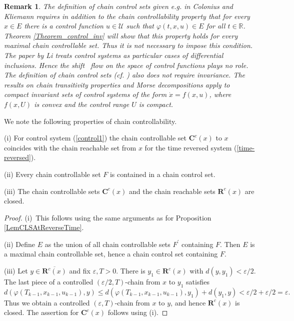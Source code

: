 \documentclass{siamltex}%
\newtheorem{remark}[theorem]{Remark}
\begin{document}
\begin{remark}
\label{Remark_invariance}The definition of chain control sets given e.g. in
Colonius and Kliemann \cite{ColK00} requires in addition to the chain
controllability property that for every $x\in E$ there is a control function
$u\in\mathcal{U}$ such that $\varphi(t,x,u)\in E$ for all $t\in\mathbb{R}$.
Theorem \ref{Theorem_control_inv}\textbf{ }will show that this property holds
for every maximal chain controllable set. Thus it is not necessary to impose
this condition. The paper by Li \cite[Proposition 6.8]{Li07} treats control
systems as particular cases of differential inclusions. Hence the shift \ flow
on the space of control functions plays no role. The definition of chain
control sets (cf. \cite[Definition 6.7]{Li07}) also does not require
invariance. The results on chain transitivity properties and Morse
decompositions apply to compact invariant sets of control systems of the form
$\dot{x}=f(x,u)$, where $f(x,U)$ is convex and the control range $U$ is compact.
\end{remark}

We note the following properties of chain controllability.

\begin{proposition}
\label{Proposition_ccs1}(i) For control system (\ref{control1}) the chain
controllable set $\mathbf{C}^{c}(x)$ to $x$ coincides with the chain reachable
set from $x$ for the time reversed system (\ref{time-reversed}).

(ii) Every chain controllable set $F$ is contained in a chain control set.

(iii) The chain controllable sets $\mathbf{C}^{c}(x)$ and the chain reachable
sets $\mathbf{R}^{c}(x)$ are closed.
\end{proposition}

\begin{proof}
(i)\ This follows using the same arguments as for Proposition
\ref{LemCLSAtReverseTime}.

(ii) Define $E$ as the union of all chain controllable sets $F^{\prime}$
containing $F$. Then $E$ is a maximal chain controllable set, hence a chain
control set containing $F$.

(iii) Let $y\in\overline{\mathbf{R}^{c}(x)}$ and fix $\varepsilon,T>0$. There
is $y_{1}\in\mathbf{R}^{c}(x)$ with $d(y,y_{1})<\varepsilon/2$. The last piece
of a controlled $(\varepsilon/2,T)$-chain from $x$ to $y_{1}$ satisfies%
\[
d(\varphi(T_{k-1},x_{k-1},u_{k-1}),y)\leq d(\varphi(T_{k-1},x_{k-1}%
,u_{k-1}),y_{1})+d(y_{1},y)<\varepsilon/2+\varepsilon/2=\varepsilon.
\]
Thus we obtain a controlled $(\varepsilon,T)$-chain from $x$ to $y$, and hence
$\mathbf{R}^{c}(x)$ is closed. The assertion for $\mathbf{C}^{c}(x)$ follows
using (i).
\end{proof}
\end{document}
